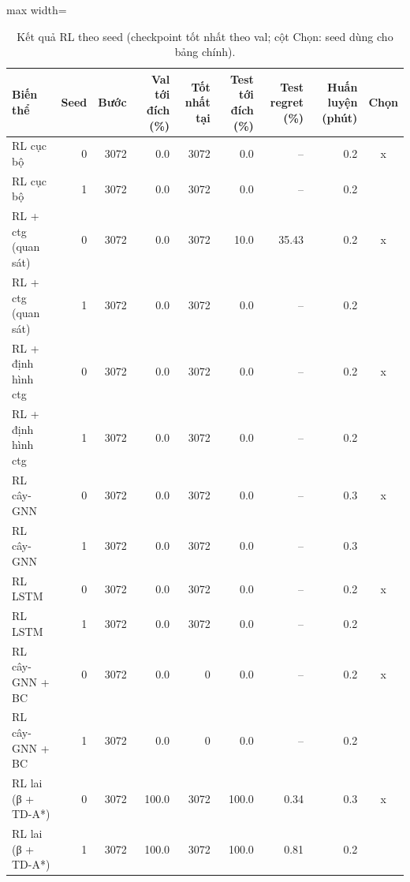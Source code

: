 \begin{table}[!htbp]
\centering
\small
\caption{Kết quả RL theo seed (checkpoint tốt nhất theo val; cột Chọn: seed dùng cho bảng chính).}
\label{tab:tab_rl_seeds}
\begin{adjustbox}{max width=\linewidth}
\begin{tabular}{lrrrrrrrc}
\toprule
Biến thể & Seed & Bước & Val tới đích (\%) & Tốt nhất tại & Test tới đích (\%) & Test regret (\%) & Huấn luyện (phút) & Chọn \\
\midrule
RL cục bộ & 0 & 3072 & 0.0 & 3072 & 0.0 & -- & 0.2 & x \\
RL cục bộ & 1 & 3072 & 0.0 & 3072 & 0.0 & -- & 0.2 &  \\
RL + ctg (quan sát) & 0 & 3072 & 0.0 & 3072 & 10.0 & 35.43 & 0.2 & x \\
RL + ctg (quan sát) & 1 & 3072 & 0.0 & 3072 & 0.0 & -- & 0.2 &  \\
RL + định hình ctg & 0 & 3072 & 0.0 & 3072 & 0.0 & -- & 0.2 & x \\
RL + định hình ctg & 1 & 3072 & 0.0 & 3072 & 0.0 & -- & 0.2 &  \\
RL cây-GNN & 0 & 3072 & 0.0 & 3072 & 0.0 & -- & 0.3 & x \\
RL cây-GNN & 1 & 3072 & 0.0 & 3072 & 0.0 & -- & 0.3 &  \\
RL LSTM & 0 & 3072 & 0.0 & 3072 & 0.0 & -- & 0.2 & x \\
RL LSTM & 1 & 3072 & 0.0 & 3072 & 0.0 & -- & 0.2 &  \\
RL cây-GNN + BC & 0 & 3072 & 0.0 & 0 & 0.0 & -- & 0.2 & x \\
RL cây-GNN + BC & 1 & 3072 & 0.0 & 0 & 0.0 & -- & 0.2 &  \\
RL lai (β + TD-A*) & 0 & 3072 & 100.0 & 3072 & 100.0 & 0.34 & 0.3 & x \\
RL lai (β + TD-A*) & 1 & 3072 & 100.0 & 3072 & 100.0 & 0.81 & 0.2 &  \\
\bottomrule
\end{tabular}
\end{adjustbox}
\end{table}
